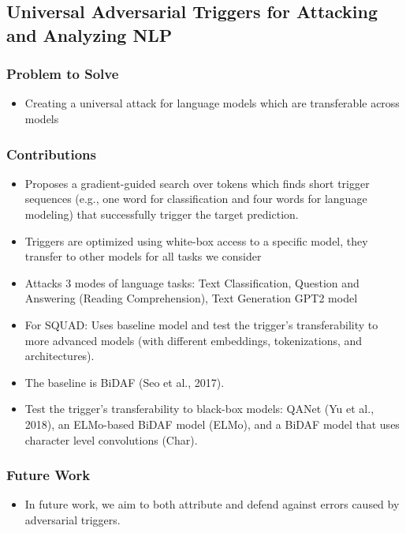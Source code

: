 \documentclass{article}
\begin{document}
\begin{flushleft}




\subsection{Universal Adversarial Triggers for Attacking and Analyzing NLP \cite{wallace2019universal} }

\subsubsection*{Problem to Solve}
\begin{itemize}
    \item Creating a universal attack for language models which are transferable across models
\end{itemize}

\subsubsection*{Contributions}
\begin{itemize}
  \item Proposes a gradient-guided search over tokens which finds short trigger sequences (e.g., one word for classification and four words for language modeling) that successfully trigger the target prediction. 
  \item Triggers are optimized using white-box access to a specific model, they transfer to other models for all tasks we consider
  \item Attacks 3 modes of language tasks: Text Classification, Question and Answering (Reading Comprehension), Text Generation GPT2 model 
  \item For SQUAD:  Uses baseline model and test the trigger’s transferability to more advanced models (with different embeddings, tokenizations, and architectures). 
  \item The baseline is BiDAF (Seo et al., 2017). 
  \item Test the trigger’s transferability to black-box models: QANet (Yu et al., 2018), an ELMo-based BiDAF model (ELMo), and a BiDAF model that uses character level convolutions (Char).
\end{itemize}

\subsubsection*{Future Work}
\begin{itemize}
  \item In future work, we aim to both attribute and defend
against errors caused by adversarial triggers.
\end{itemize}


\end{flushleft}
\end{document}
